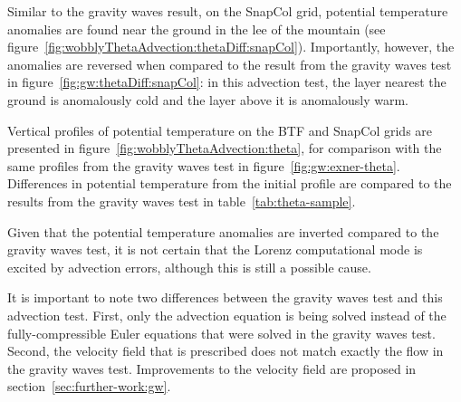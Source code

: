 Similar to the gravity waves result, on the SnapCol grid, potential temperature anomalies are found near the ground in the lee of the mountain (see figure~\ref{fig:wobblyThetaAdvection:thetaDiff:snapCol}).  Importantly, however, the anomalies are reversed when compared to the result from the gravity waves test in figure~\ref{fig:gw:thetaDiff:snapCol}: in this advection test, the layer nearest the ground is anomalously cold and the layer above it is anomalously warm.

Vertical profiles of potential temperature on the BTF and SnapCol grids are presented in figure~\ref{fig:wobblyThetaAdvection:theta}, for comparison with the same profiles from the gravity waves test in figure~\ref{fig:gw:exner-theta}.
Differences in potential temperature from the initial profile are compared to the results from the gravity waves test in table~\ref{tab:theta-sample}.

Given that the potential temperature anomalies are inverted compared to the gravity waves test, it is not certain that the Lorenz computational mode is excited by advection errors, although this is still a possible cause.

It is important to note two differences between the gravity waves test and this advection test.  First, only the advection equation is being solved instead of the fully-compressible Euler equations that were solved in the gravity waves test.  Second, the velocity field that is prescribed does not match exactly the flow in the gravity waves test.  Improvements to the velocity field are proposed in section~\ref{sec:further-work:gw}.

